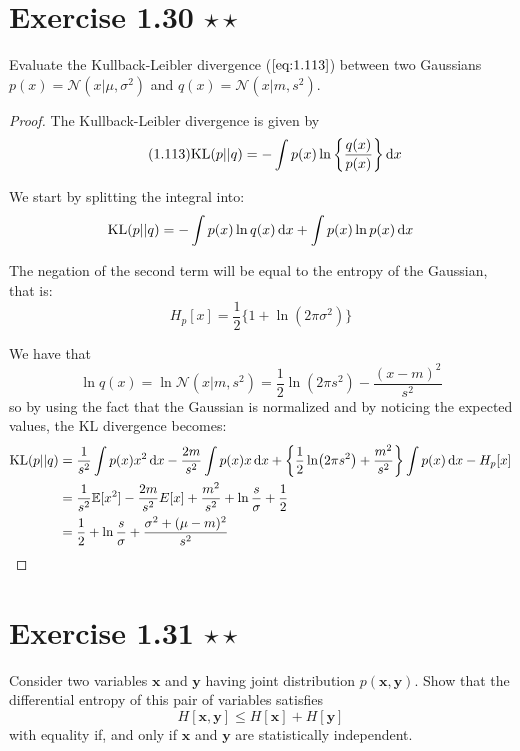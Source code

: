 \section*{Exercise 1.30 $\star \star$}
Evaluate the Kullback-Leibler divergence ($\ref{eq:1.113}$) between two Gaussians
$p(x) = \mathcal{N}(x | \mu, \sigma^2)$ and $q(x) = \mathcal{N}(x | m, s^2)$.

\vspace{1em}

\begin{proof}
    The Kullback-Leibler divergence is given by 
    \begin{equation}\label{eq:1.113}\tag{1.113}
        \text{KL}(p || q) = - \int p(x) \ln \bigg\{ \frac{q(x)}{p(x)} \bigg\} \mathop{}\!\mathrm{d} x
    \end{equation}

    We start by splitting the integral into:
    \[
        \text{KL}(p || q) = 
            -\int p(x) \ln q(x) \mathop{}\!\mathrm{d} x + \int p(x) \ln p(x) \mathop{}\!\mathrm{d} x
    \] 

    The negation of the second term will be equal to the entropy of the Gaussian,
    that is:
    \begin{equation}\label{eq:1.110}\tag{1.110}
        H_p[x] = \frac{1}{2} \{1 + \ln (2\pi \sigma^2)\}
    \end{equation}

    We have that
    \[
        \ln q(x) = \ln \mathcal{N} (x | m, s^2) = \frac{1}{2} \ln(2\pi s^2) - \frac{(x - m)^2}{s^2}
    \] 
    so by using the fact that the Gaussian is normalized and by noticing the expected
    values, the KL divergence becomes:
    \begin{align*}
        \text{KL}(p || q) 
        &= \frac{1}{s^2}\int p(x) x^2 \mathop{}\!\mathrm{d} x - \frac{2m}{s^2} \int p(x) x \mathop{}\!\mathrm{d} x 
        + \bigg\{\frac{1}{2} \ln(2\pi s^2) + \frac{m^2}{s^2}\bigg\} \int p(x) \mathop{}\!\mathrm{d} x
        - H_p[x] \\
        &= \frac{1}{s^2} \mathbb{E}[x^2] - \frac{2m}{s^2}E[x] 
        + \frac{m^2}{s^2} + \ln \frac{s}{\sigma} + \frac{1}{2} \\
        &= \frac{1}{2} + \ln \frac{s}{\sigma} + \frac{\sigma^2 + (\mu - m)^2}{s^2}
    \end{align*}
\end{proof}

\section*{Exercise 1.31 $\star \star$}
Consider two variables $\mathbf{x}$ and $\mathbf{y}$ having joint distribution
$p(\mathbf{x}, \mathbf{y})$. Show that the differential entropy of this pair of 
variables satisfies
\begin{equation}\label{eq:1.152}\tag{1.152}
    H[\mathbf{x}, \mathbf{y}] \leq H[\mathbf{x}] + H[\mathbf{y}]
\end{equation}
with equality if, and only if $\mathbf{x}$ and $\mathbf{y}$ are statistically
independent.

